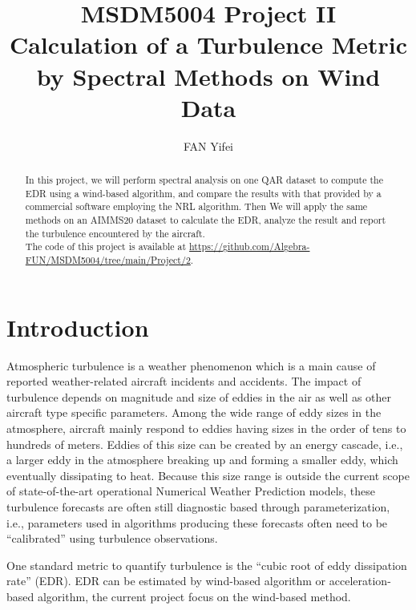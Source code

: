 \documentclass[runningheads]{llncs}
\begin{document}
\title{
    MSDM5004 Project II\\
    Calculation of a Turbulence Metric by Spectral Methods on Wind Data}
\author{FAN Yifei}
\maketitle

\begin{abstract}
    In this project, we will perform spectral analysis on one QAR dataset to compute the EDR using a wind-based algorithm, 
    and compare the results with that provided by a commercial software employing the NRL algorithm. 
    Then We will apply the same methods on an AIMMS20 dataset to calculate the EDR, analyze the result and report the turbulence encountered by the aircraft.\\
    The code of this project is available at \url{https://github.com/Algebra-FUN/MSDM5004/tree/main/Project/2}.
\end{abstract}

\section{Introduction}

Atmospheric turbulence is a weather phenomenon which is a main cause of reported weather-related aircraft incidents and accidents. The impact of turbulence depends on magnitude and size of eddies in the air as well as other aircraft type specific parameters.
Among the wide range of eddy sizes in the atmosphere, aircraft mainly respond to eddies having sizes in the order of tens to hundreds of meters. Eddies of this size can be created by an energy cascade, i.e., a larger eddy in the atmosphere breaking up and forming a smaller eddy, which eventually dissipating to heat. Because this size range is outside the current scope of state-of-the-art operational Numerical Weather Prediction models, these turbulence forecasts are often still diagnostic based through parameterization, i.e., parameters used in algorithms producing these forecasts often need to be “calibrated” using turbulence observations.

One standard metric to quantify turbulence is the “cubic root of eddy dissipation rate” (EDR). 
EDR can be estimated by wind-based algorithm or acceleration-based algorithm, the current project focus on the wind-based method.
\end{document}
